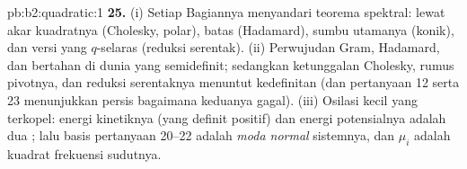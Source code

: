 \begin{solution}{pb:b2:quadratic:1}
\textbf{25.} (i) Setiap Bagiannya menyandari teorema spektral:
lewat akar kuadratnya (Cholesky, polar), batas  (Hadamard), sumbu utamanya (konik), dan
versi yang $q$-selaras (reduksi serentak). (ii) Perwujudan
Gram, Hadamard, dan  bertahan di
dunia yang semidefinit; sedangkan ketunggalan Cholesky, rumus
pivotnya, dan reduksi serentaknya menuntut kedefinitan
(dan pertanyaan 12 serta 23 menunjukkan persis bagaimana keduanya gagal). (iii)
Osilasi kecil yang terkopel: energi kinetiknya (yang definit positif)
dan energi potensialnya adalah dua ; lalu basis
pertanyaan 20--22 adalah \emph{moda normal} sistemnya, dan
$\mu_i$ adalah kuadrat frekuensi sudutnya.

\end{solution}

